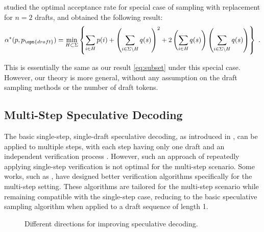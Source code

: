 \citet{khisti2024importanceweighted} studied the optimal acceptance rate for special case of sampling with replacement for $n=2$ drafts, and obtained the following result:
\begin{equation}
\alpha^\ast(p,p_{\opn{draft}}) = \min_{H \subset\Sigma} \left\{
\sum_{i\in H} p(i)+\left(\sum_{i\in \Sigma\setminus H} q(s)\right)^2+2\left(\sum_{i\in H} q(s)\right)\left(\sum_{i\in \Sigma\setminus H} q(s)\right)
\right\}
~.
\end{equation}

This is essentially the same as our result \eqref{eq:subset} under this special case. 
However, our theory is more general, without any assumption on the draft sampling methods or the number of draft tokens.

\subsection{Multi-Step Speculative Decoding}\label{sec:related_multi_step}
The basic single-step, single-draft speculative decoding, as introduced in , can be applied to multiple steps, with each step having only one draft and an independent verification process \citep{leviathan2023fast,chen2023accelerating}. However, such an approach of repeatedly applying single-step verification is not optimal for the multi-step scenario. Some works, such as \citet{sun2024optimal,huaccelerated,sunblock}, have designed better verification algorithms specifically for the multi-step setting. These algorithms are tailored for the multi-step scenario while remaining compatible with the single-step case, reducing to the basic speculative sampling algorithm when applied to a draft sequence of length 1.

\begin{figure}[h]
\centering
{}

\caption{Different directions for improving speculative decoding.}
\label{fig:related_work}
\end{figure}


